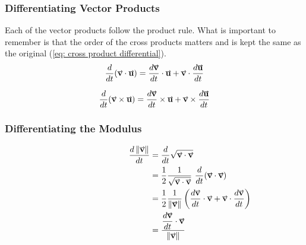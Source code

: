 \documentclass[main.tex]{subfiles}
\begin{document}
                \subsubsection{Differentiating Vector Products}
                    \label{subsubsec: Differentiating Vector Products}

                    Each of the vector products follow the product rule. What is important to remember is that the order of the cross products matters and is kept the same as the original (\eqref{eq: cross product differential}).
                    \begin{equation}
                        \frac{d}{dt}(\vect{v} \cdot \vect{u}) = \frac{d\vect{v}}{dt} \cdot \vect{u} + \vect{v} \cdot \frac{d\vect{u}}{dt}
                        \label{eq: dot product differential}
                    \end{equation}
                    \hspace{5mm}
        
                    \begin{equation}
                        \frac{d}{dt}(\vect{v} \times \vect{u}) = \frac{d\vect{v}}{dt} \times \vect{u} + \vect{v} \times \frac{d\vect{u}}{dt}
                        \label{eq: cross product differential}
                    \end{equation}

                \newpage
                \subsubsection{Differentiating the Modulus}
                    \label{subsubsec: Differentiating the Modulus}

                    \begin{align*}
                        \hspace{30mm}\frac{d\vmod{\vect{v}}}{dt} &= \frac{d}{dt}\sqrt{\vect{v} \cdot \vect{v}}\\
                        &= \frac{1}{2}\frac{1}{\sqrt{\vect{v} \cdot \vect{v}}} \ \frac{d}{dt}(\vect{v} \cdot \vect{v})\\
                        &=\frac{1}{2}\frac{1}{\vmod{\vect{v}}} \left(\frac{d\vect{v}}{dt}\cdot\vect{v} + \vect{v} \cdot \frac{d\vect{v}}{dt}\right)\\
                        &=\bfrac{\frac{d\vect{v}}{dt}\cdot\vect{v}}{\vmod{\vect{v}}}
                    \end{align*}
                    \vspace{5mm}
\end{document}
